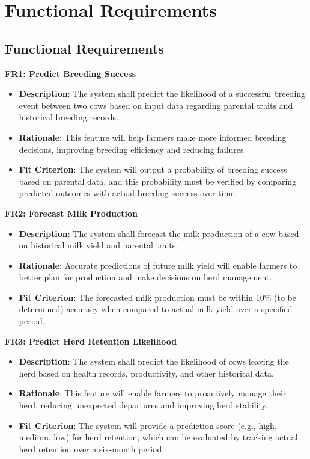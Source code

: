 \documentclass[12pt]{article}
\begin{document}
\section{Functional Requirements}

\subsection{Functional Requirements}

\textbf{FR1: Predict Breeding Success}
\begin{itemize}
    \item \textbf{Description}: The system shall predict the likelihood of a 
    successful breeding event between two cows based on input data regarding 
    parental traits and historical breeding records.
    \item \textbf{Rationale}: This feature will help farmers make more informed 
    breeding decisions, improving breeding efficiency and reducing failures.
    \item \textbf{Fit Criterion}: The system will output a probability of 
    breeding success based on parental data, and this probability must be 
    verified by comparing predicted outcomes with actual breeding success over 
    time.
\end{itemize}
\textbf{FR2: Forecast Milk Production}
\begin{itemize}
    \item \textbf{Description}: The system shall forecast the milk production 
    of a cow based on historical milk yield and parental traits.
    \item \textbf{Rationale}: Accurate predictions of future milk yield will 
    enable farmers to better plan for production and make decisions on herd 
    management.
    \item \textbf{Fit Criterion}: The forecasted milk production must be within 
    10\% (to be determined) accuracy when compared to actual milk yield over a 
    specified period.
\end{itemize}
\textbf{FR3: Predict Herd Retention Likelihood}
\begin{itemize}
    \item \textbf{Description}: The system shall predict the likelihood of 
    cows leaving the herd based on health records, productivity, and other 
    historical data.
    \item \textbf{Rationale}: This feature will enable farmers to proactively 
    manage their herd, reducing unexpected departures and improving herd 
    stability.
    \item \textbf{Fit Criterion}: The system will provide a prediction score 
    (e.g., high, medium, low) for herd retention, which can be evaluated by 
    tracking actual herd retention over a six-month period.
\end{itemize}
\end{document}
